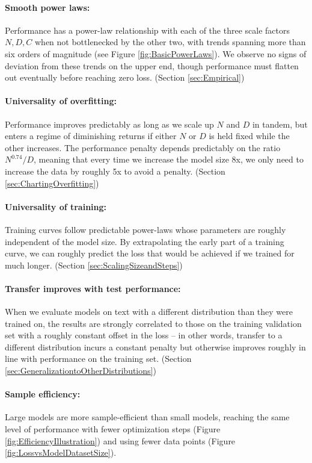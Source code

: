 \documentclass[english]{article}
\begin{document}
\paragraph{Smooth power laws:} Performance has a power-law relationship with each of the three scale factors $N, D, C$ when not bottlenecked by the other two, with trends spanning more than six orders of magnitude (see Figure \ref{fig:BasicPowerLaws}). We observe no signs of deviation from these trends on the upper end, though performance must flatten out eventually before reaching zero loss. (Section \ref{sec:Empirical})

\paragraph{Universality of overfitting:} Performance improves predictably as long as we scale up $N$ and $D$ in tandem, but enters a regime of diminishing returns if either $N$ or $D$ is held fixed while the other increases.  The performance penalty depends predictably on the ratio $N^{0.74}/D$, meaning that every time we increase the model size 8x, we only need to increase the data by roughly 5x to avoid a penalty. (Section \ref{sec:ChartingOverfitting})

\paragraph{Universality of training:} Training curves follow predictable power-laws whose parameters are roughly independent of the model size.  By extrapolating the early part of a training curve, we can roughly predict the loss that would be achieved if we trained for much longer. (Section \ref{sec:ScalingSizeandSteps})

\paragraph{Transfer improves with test performance:} When we evaluate models on text with a different distribution than they were trained on, the results are strongly correlated to those on the training validation set with a roughly constant offset in the loss -- in other words, transfer to a different distribution incurs a constant penalty but otherwise improves roughly in line with performance on the training set. (Section \ref{sec:GeneralizationtoOtherDistributions})

\paragraph{Sample efficiency:} Large models are  more sample-efficient than small models, reaching the same level of performance with fewer optimization steps (Figure \ref{fig:EfficiencyIllustration}) and using  fewer data points (Figure \ref{fig:LossvsModelDatasetSize}).
\end{document}

